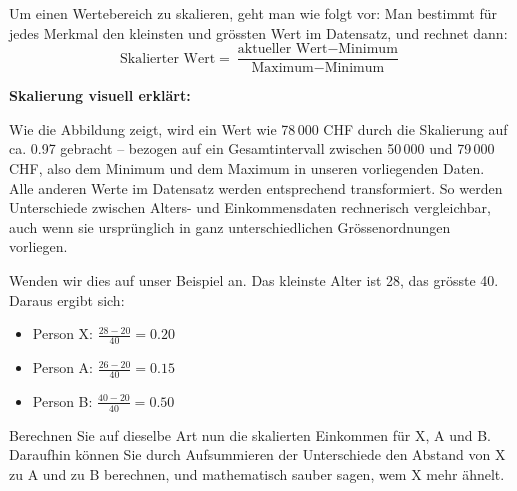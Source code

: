 \begin{lpu}
\begin{theorie}
    Um einen Wertebereich zu skalieren, geht man wie folgt vor: Man bestimmt für jedes Merkmal den kleinsten und grössten Wert im Datensatz, und rechnet dann:
    \[
\text{Skalierter Wert} = \frac{\text{aktueller Wert} - \text{Minimum}}{\text{Maximum} - \text{Minimum}}
\]
\end{theorie}

\textbf{Skalierung visuell erklärt:}

\begin{center}
\end{center}



Wie die Abbildung zeigt, wird ein Wert wie 78\,000 CHF durch die Skalierung auf ca. 0.97 gebracht – bezogen auf ein Gesamtintervall zwischen 50\,000 und 79\,000 CHF, also dem Minimum und dem Maximum in unseren vorliegenden Daten. Alle anderen Werte im Datensatz werden entsprechend transformiert. So werden Unterschiede zwischen Alters- und Einkommensdaten rechnerisch vergleichbar, auch wenn sie ursprünglich in ganz unterschiedlichen Grössenordnungen vorliegen.

Wenden wir dies auf unser Beispiel an. Das kleinste Alter ist 28, das grösste 40. Daraus ergibt sich:

\begin{itemize}
  \item Person X: $\frac{28 - 20}{40} = 0.20$
  \item Person A: $\frac{26 - 20}{40} = 0.15$
  \item Person B: $\frac{40 - 20}{40} = 0.50$
\end{itemize}

\begin{aufgabe}{4}
    Berechnen Sie auf dieselbe Art nun die skalierten Einkommen für X, A und B. Daraufhin können Sie durch Aufsummieren der Unterschiede den Abstand von X zu A und zu B berechnen, und mathematisch sauber sagen, wem X mehr ähnelt.
\end{aufgabe}


\end{lpu}

